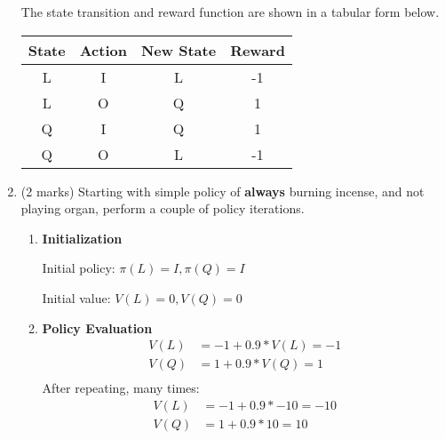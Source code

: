 \documentclass[addpoints,12pt,solution]{exam}
\begin{document}
\begin{questions}
\begin{enumerate}[label=(\alph*)]
\begin{solution}
                The state transition and reward function are shown in a tabular form below.

                \begin{center}
                    \begin{tabular}{|cc|cc|}
                        \hline
                        State & Action & New State & Reward \\
                        \hline
                        L     & I      & L         & -1     \\
                        L     & O      & Q         & 1      \\
                        Q     & I      & Q         & 1      \\
                        Q     & O      & L         & -1     \\
                        \hline
                    \end{tabular}
                \end{center}


            \end{solution}

            \item (2 marks) Starting with simple policy of \textbf{always} burning incense, and not playing organ, perform a couple of policy iterations.

            \begin{solution}

                \begin{enumerate}
                    \item \textbf{Initialization}

                    Initial policy: $\pi(L) = I, \pi(Q) = I$

                    Initial value: $V(L) = 0,V(Q) = 0$

                    \item \textbf{Policy Evaluation}
                    \begin{align*}
                        V(L) &= -1 + 0.9 * V(L)  = -1 \\
                        V(Q) &= 1 + 0.9 * V(Q) = 1 \\
                    \end{align*}
                    After repeating, many times:
                    \begin{align*}
                        V(L) &= -1 + 0.9 * -10  = -10 \\
                        V(Q) &= 1 + 0.9 * 10 = 10 \\
                    \end{align*}


\end{enumerate}
\end{solution}
\end{enumerate}
\end{questions}
\end{document}
